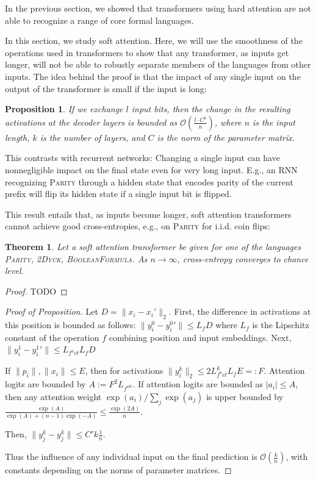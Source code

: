 \documentclass[11pt,a4paper]{article}
\newcounter{theorem}
\newtheorem{proposition}[theorem]{Proposition}
\newtheorem{thm}[theorem]{Theorem}
\begin{document}
In the previous section, we showed that transformers using hard attention are not able to recognize a range of core formal languages.

In this section, we study soft attention. %
Here, we will use the smoothness of the operations used in transformers to show that any transformer, as inputs get longer, will not be able to robustly separate members of the languages from other inputs.
The idea behind the proof is that the impact of any single input on the output of the transformer is small if the input is long:
\begin{proposition}
If we exchange $l$ input bits, %
then the change in the resulting activations at the decoder layers is bounded as $\mathcal{O}(\frac{l\cdot C^k}{n})$, where $n$ is the input length, $k$ is the number of layers, and $C$ is the norm of the parameter matrix.
\end{proposition}
This contrasts with recurrent networks:
Changing a single input can have nonnegligible impact on the final state even for very long input.
E.g., an RNN recognizing \textsc{Parity} through a hidden state that encodes parity of the current prefix will flip its hidden state if a single input bit is flipped.


This result entails that, as inputs become longer, soft attention transformers cannot achieve good cross-entropies, e.g., on \textsc{Parity} for i.i.d. coin flips:

\begin{thm}
Let a soft attention transformer be given for one of the languages \textsc{Parity}, \textsc{2Dyck}, \textsc{BooleanFormula}.
As $n\rightarrow\infty$, cross-entropy converges to chance level.
\end{thm}

\begin{proof}
TODO
\end{proof}

\begin{proof}[Proof of Proposition]
Let $D = \|x_i-x_i'\|_2$.
First, the difference in activations at this position is bounded as follows:
$\|y_i^0 - {y_i^0}'\| \leq L_f D$
where $L_f$ is the Lipschitz constant of the operation $f$ combining position and input embeddings.
Next, $\|y_i^1 - {y_i^1}'\| \leq L_{f^act} L_f D$

If $\|p_i\|, \|x_i\| \leq E$, then for activations $\|y_i^k\|_2 \leq 2 L_{f^act}^k L_f E =: F$.
Attention logits are bounded by $A := F^2 L_{f^{att}}$.
If attention logits are bounded as $|a_i| \leq A$,
then any attention weight $\exp(a_i)/\sum_j \exp(a_j)$ is upper bounded by $\frac{\exp(A)}{\exp(A) + (n-1) \exp(-A)} \leq \frac{\exp(2A)}{n}$.

Then, $\|y_j^k - {y_j^k}\| \leq C' k \frac{1}{n}$.

Thus the influence of any individual input on the final prediction is $\mathcal{O}(\frac{k}{n})$, with constants depending on the norms of parameter matrices.
\end{proof}
\end{document}
